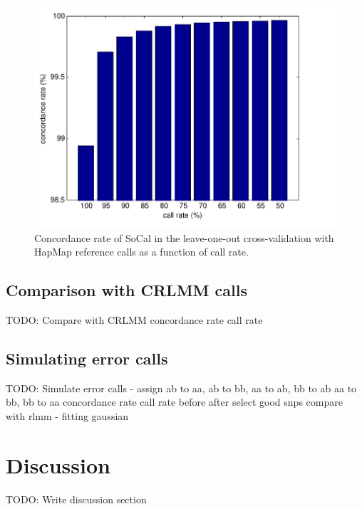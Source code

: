 \documentclass{scrartcl}
\begin{document}
\begin{figure}[H]
\centering
\includegraphics[scale=0.75]
{result_figs/cmp_socal_hapmap/cmp_socal_hapmap_cr_vs_acc.pdf}
\caption{Concordance rate of SoCal in the leave-one-out cross-validation with
HapMap reference calls as a function of call rate.}
\label{fig:result_sh_crvacc}
\end{figure}


\subsection{Comparison with CRLMM calls}
TODO: Compare with CRLMM
concordance rate
call rate

\subsection{Simulating error calls}
TODO: Simulate error calls - assign ab to aa, ab to bb, aa to ab, bb to ab
aa to bb, bb to aa
concordance rate
call rate
before
after
select good snps
compare with rlmm - fitting gaussian













\section{Discussion}
TODO: Write discussion section
\end{document}
